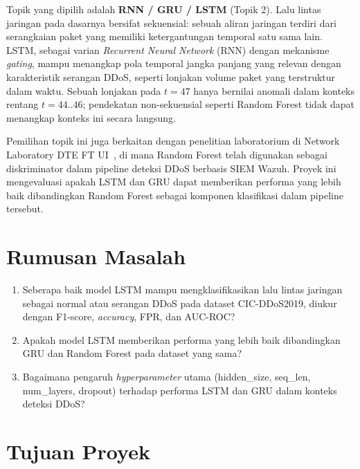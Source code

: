 \documentclass[11pt,a4paper,oneside]{report}
\begin{document}
Topik yang dipilih adalah \textbf{RNN / GRU / LSTM} (Topik 2). Lalu lintas jaringan pada dasarnya bersifat sekuensial: sebuah aliran jaringan terdiri dari serangkaian paket yang memiliki ketergantungan temporal satu sama lain. LSTM, sebagai varian \textit{Recurrent Neural Network} (RNN) dengan mekanisme \textit{gating}, mampu menangkap pola temporal jangka panjang yang relevan dengan karakteristik serangan DDoS, seperti lonjakan volume paket yang terstruktur dalam waktu. Sebuah lonjakan pada $t=47$ hanya bernilai anomali dalam konteks rentang $t=44..46$; pendekatan non-sekuensial seperti Random Forest tidak dapat menangkap konteks ini secara langsung.

Pemilihan topik ini juga berkaitan dengan penelitian laboratorium di Network Laboratory DTE FT UI~\cite{breiman2001}, di mana Random Forest telah digunakan sebagai diskriminator dalam pipeline deteksi DDoS berbasis SIEM Wazuh. Proyek ini mengevaluasi apakah LSTM dan GRU dapat memberikan performa yang lebih baik dibandingkan Random Forest sebagai komponen klasifikasi dalam pipeline tersebut.

\section{Rumusan Masalah}

\begin{enumerate}[label=RM\arabic*.,leftmargin=*]
    \item Seberapa baik model LSTM mampu mengklasifikasikan lalu lintas jaringan sebagai normal atau serangan DDoS pada dataset CIC-DDoS2019, diukur dengan F1-score, \textit{accuracy}, FPR, dan AUC-ROC?
    \item Apakah model LSTM memberikan performa yang lebih baik dibandingkan GRU dan Random Forest pada dataset yang sama?
    \item Bagaimana pengaruh \textit{hyperparameter} utama (hidden\_size, seq\_len, num\_layers, dropout) terhadap performa LSTM dan GRU dalam konteks deteksi DDoS?
\end{enumerate}

\section{Tujuan Proyek}
\end{document}
